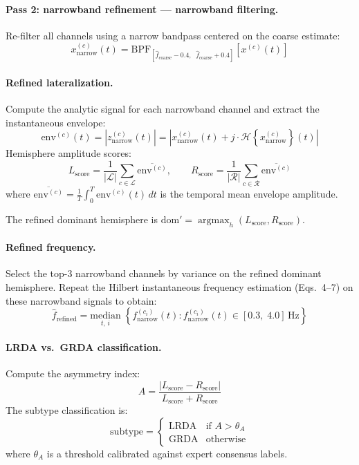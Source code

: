 \paragraph{Pass 2: narrowband refinement --- narrowband filtering.}
Re-filter all channels using a narrow bandpass centered on the coarse estimate:
\[ x_{\mathrm{narrow}}^{(c)}(t) = \mathrm{BPF}_{[\hat{f}_{\mathrm{coarse}} - 0.4,\;\; \hat{f}_{\mathrm{coarse}} + 0.4]}\!\left[x^{(c)}(t)\right] \tag{8} \]

\paragraph{Refined lateralization.}
Compute the analytic signal for each narrowband channel and extract the instantaneous envelope:
\[ \mathrm{env}^{(c)}(t) = \left|z_{\mathrm{narrow}}^{(c)}(t)\right| = \left|x_{\mathrm{narrow}}^{(c)}(t) + j \cdot \mathcal{H}\!\left\{x_{\mathrm{narrow}}^{(c)}\right\}(t)\right| \tag{9} \]
Hemisphere amplitude scores:
\[ L_{\mathrm{score}} = \frac{1}{|\mathcal{L}|} \sum_{c \in \mathcal{L}} \overline{\mathrm{env}^{(c)}}, \qquad R_{\mathrm{score}} = \frac{1}{|\mathcal{R}|} \sum_{c \in \mathcal{R}} \overline{\mathrm{env}^{(c)}} \tag{10} \]
where $\overline{\mathrm{env}^{(c)}} = \frac{1}{T} \int_0^T \mathrm{env}^{(c)}(t)\, dt$ is the temporal mean envelope amplitude.

The refined dominant hemisphere is $\mathrm{dom}' = \operatorname{argmax}_{h}(L_{\mathrm{score}}, R_{\mathrm{score}})$.

\paragraph{Refined frequency.}
Select the top-3 narrowband channels by variance on the refined dominant hemisphere. Repeat the Hilbert instantaneous frequency estimation (Eqs.~4--7) on these narrowband signals to obtain:
\[ \hat{f}_{\mathrm{refined}} = \underset{t,\, i}{\mathrm{median}}\;\left\{f_{\mathrm{narrow}}^{(c_i)}(t) : f_{\mathrm{narrow}}^{(c_i)}(t) \in [0.3,\; 4.0]\,\mathrm{Hz}\right\} \tag{11} \]

\paragraph{LRDA vs.\ GRDA classification.}
Compute the asymmetry index:
\[ A = \frac{|L_{\mathrm{score}} - R_{\mathrm{score}}|}{L_{\mathrm{score}} + R_{\mathrm{score}}} \tag{12} \]
The subtype classification is:
\[ \mathrm{subtype} = \begin{cases} \text{LRDA} & \text{if } A > \theta_A \\ \text{GRDA} & \text{otherwise} \end{cases} \tag{13} \]
where $\theta_A$ is a threshold calibrated against expert consensus labels.

